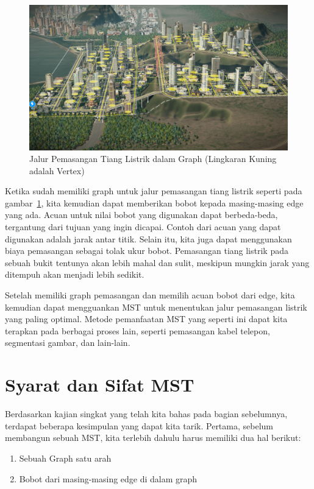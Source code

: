 \begin{figure}
    \includegraphics[width=\textwidth,keepaspectratio]{fig/ElectricityInstallation.png}%
	\caption{Jalur Pemasangan Tiang Listrik dalam Graph (Lingkaran Kuning adalah Vertex)}%
	\label{fig:electricity-installation}%
\end{figure}

Ketika sudah memiliki graph untuk jalur pemasangan tiang listrik seperti pada gambar~\ref{fig:electricity-installation}, kita kemudian dapat memberikan bobot kepada masing-masing edge yang ada. Acuan untuk nilai bobot yang digunakan dapat berbeda-beda, tergantung dari tujuan yang ingin dicapai. Contoh dari acuan yang dapat digunakan adalah jarak antar titik. Selain itu, kita juga dapat menggunakan biaya pemasangan sebagai tolak ukur bobot. Pemasangan tiang listrik pada sebuah bukit tentunya akan lebih mahal dan sulit, meskipun mungkin jarak yang ditempuh akan menjadi lebih sedikit.

Setelah memiliki graph pemasangan dan memilih acuan bobot dari edge, kita kemudian dapat mengguankan MST untuk menentukan jalur pemasangan listrik yang paling optimal. Metode pemanfaatan MST yang seperti ini dapat kita terapkan pada berbagai proses lain, seperti pemasangan kabel telepon, segmentasi gambar, dan lain-lain.

\section{Syarat dan Sifat MST}

Berdasarkan kajian singkat yang telah kita bahas pada bagian sebelumnya, terdapat beberapa kesimpulan yang dapat kita tarik. Pertama, sebelum membangun sebuah MST, kita terlebih dahulu harus memiliki dua hal berikut:

\begin{enumerate}
    \item Sebuah Graph satu arah
    \item Bobot dari masing-masing edge di dalam graph
\end{enumerate}

